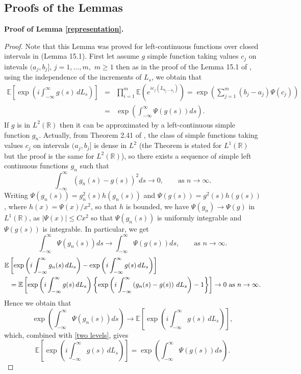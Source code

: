 \documentclass[preprint,12pt]{article}
\begin{document}
\subsection{Proofs of the Lemmas}
{\bf Proof of Lemma \ref{representation}.}
\begin{proof}
Note that this  Lemma  was proved for left-continuous functions over closed intervals in \cite{ContTankov2003} (Lemma 15.1).
First let assume $g$ simple function taking  values $c_j$ on intevals $(a_j,b_j]$, $j=1,\ldots,m,$ $m\ge1$ then as in the proof of the Lemma 15.1 of \cite{ContTankov2003}, using the independence of the increments of $L_s$, we obtain that
\begin{eqnarray*}
\mathbb{E}\left[\exp\left(i\int_{-\infty}^\infty g(s)\,dL_s\right)\right]
&=&\prod_{i=1}^m\mathbb{E}\left(e^{ic_j(L_{b_j-a_j})}\right)=\exp\left(\sum_{j=1}^m(b_j-a_j)\Psi(c_j)\right)\\
&=&\exp\left(\int_{-\infty}^\infty \Psi(g(s))ds\right).
\end{eqnarray*}
If $g$ is in $L^2(\mathbb{R})$ then it can be approximated by a left-continuous simple function $g_n$. Actually, from Theorem 2.41 of \cite{Folland1999}, the class of simple functions taking values $c_j$ on intervals $(a_j,b_j]$ is dense in $L^2$ (the Theorem is stated for $L^1(\mathbb{R})$  but the proof is the same for $L^2(\mathbb{R})$), so there exists a sequence  of simple left continuous functions $g_n$
 such that
 $$
\int_{-\infty}^\infty (g_n(s)-g(s))^2ds\to0,\qquad\textrm{as }n\to\infty.
$$
Writing $\Psi(g_n(s))=g^2_n(s)h(g_n(s))$ and $\Psi(g(s))=g^2(s)h(g(s))$, where $h(x)=\Psi(x)/x^2$, so that $h$ is bounded, we have $\Psi(g_n)\to\Psi(g)$ in $L^1(\mathbb{R})$, as $\vert\Psi(x)\vert\le Cx^2$ so that $\Psi(g_n(s))$ is uniformly integrable and $\Psi(g(s))$ is integrable. In particular, we get
\begin{equation}\label{two levels}
\int_{-\infty}^\infty \Psi(g_n(s))ds\to\int_{-\infty}^\infty\Psi(g(s))ds,\qquad\textrm{as }n\to\infty.
\end{equation}
\begin{eqnarray*}\lefteqn{
\mathbb{E}\left[\exp\left(i\int_{-\infty}^\infty g_n(s)\,dL_s\right)-\exp\left(i\int_{-\infty}^\infty g(s)\,dL_s\right)\right]}\\
&&=\mathbb{E}\left[\exp\left(i\int_{-\infty}^\infty g(s)\,dL_s\right)\left\{\exp\left(i\int_{-\infty}^\infty \left(g_n(s)-g(s)\right)\,dL_s\right)-1\right\}\right]\to0\textrm{ as }n\to\infty.
\end{eqnarray*}
Hence we obtain that
$$
\exp\left(\int_{-\infty}^\infty \Psi(g_n(s))ds\right)\to\mathbb{E}\left[\exp\left(i\int_{-\infty}^\infty g(s)\,dL_s\right)\right],
$$
which, combined with \eqref{two levels}, gives
$$
\mathbb{E}\left[\exp\left(i\int_{-\infty}^\infty g(s)\,dL_s\right)\right]=\exp\left(\int_{-\infty}^\infty\Psi(g(s))ds\right).
$$
\end{proof}\noindent
\end{document}
